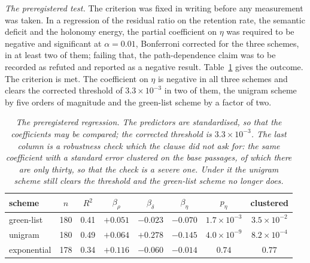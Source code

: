 \documentclass[11pt,a4paper]{article}
\theoremstyle{plain}
\theoremstyle{definition}
\numberwithin{equation}{section}
\begin{document}
\medskip
\noindent\emph{The preregistered test.}
The criterion was fixed in writing before any measurement was taken. In
a regression of the residual ratio on the retention rate, the semantic
deficit and the holonomy energy, the partial coefficient on $\eta$ was
required to be negative and significant at $\alpha = 0.01$, Bonferroni
corrected for the three schemes, in at least two of them; failing that,
the path-dependence claim was to be recorded as refuted and reported as
a negative result. Table~\ref{tab:resultd} gives the outcome. The
criterion is met. The coefficient on $\eta$ is negative in all three
schemes and clears the corrected threshold of $3.3\times10^{-3}$ in two
of them, the unigram scheme by five orders of magnitude and the
green-list scheme by a factor of two.

\begin{table}[t]
\centering
\small
\begin{tabular}{lccccccc}
\toprule
scheme & $n$ & $R^2$ & $\beta_\rho$ & $\beta_\delta$ & $\beta_\eta$ &
$p_\eta$ & clustered\\
\midrule
green-list  & 180 & 0.41 & $+0.051$ & $-0.023$ & $-0.070$ &
  $1.7\times10^{-3}$ & $3.5\times10^{-2}$\\
unigram     & 180 & 0.49 & $+0.064$ & $+0.278$ & $-0.145$ &
  $4.0\times10^{-9}$ & $8.2\times10^{-4}$\\
exponential & 178 & 0.34 & $+0.116$ & $-0.060$ & $-0.014$ &
  $0.74$ & $0.77$\\
\bottomrule
\end{tabular}
\caption{\emph{The preregistered regression. The predictors are
standardised, so that the coefficients may be compared; the corrected
threshold is $3.3\times10^{-3}$. The last column is a robustness check
which the clause did not ask for: the same coefficient with a standard
error clustered on the base passages, of which there are only thirty, so
that the check is a severe one. Under it the unigram scheme still clears
the threshold and the green-list scheme no longer does.}}
\label{tab:resultd}
\end{table}
\end{document}
